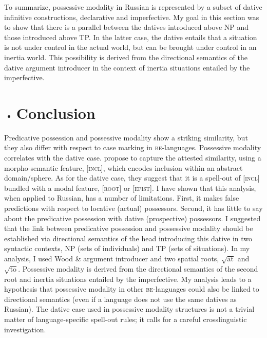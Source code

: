 \documentclass[output=paper,modfonts,nonflat]{langsci/langscibook}
\begin{document}
To summarize, possessive modality in Russian is represented by a subset of dative infinitive constructions, declarative and imperfective. My goal in this section was to show that there is a parallel between the datives introduced above NP and those introduced above TP. In the latter case, the dative entails that a situation is not under control in the actual world, but can be brought under control in an inertia world. This possibility is derived from the directional semantics of the dative argument introducer in the context of inertia situations entailed by the imperfective.

\begin{itemize}
\item \section{Conclusion}
\end{itemize}

Predicative possession and possessive modality show a striking similarity, but they also differ with respect to case marking in \textsc{be}{}-languages. Possessive modality correlates with the dative case. \citet{BjorkmanCowper2016} propose to capture the attested similarity, using a morpho-semantic feature, [\textsc{incl}], which encodes inclusion within an abstract domain/sphere. As for the dative case, they suggest that it is a spell-out of [\textsc{incl}] bundled with a modal feature, [\textsc{root}] or [\textsc{epist}]. I have shown that this analysis, when applied to Russian, has a number of limitations. First, it makes false predictions with respect to locative (actual) possessors. Second, it has little to say about the predicative possession with dative (prospective) possessors. I suggested that the link between predicative possession and possessive modality should be established via directional semantics of the head introducing this dative in two syntactic contexts, NP (sets of individuals) and TP (sets of situations). In my analysis, I used Wood \&  argument introducer and two spatial roots,  $\sqrt{\text{at}}$  and  $\sqrt{\text{to}}$. Possessive modality is derived from the directional semantics of the second root and inertia situations entailed by the imperfective. My analysis leads to a hypothesis that possessive modality in other \textsc{be}{}-languages could also be linked to directional semantics (even if a language does not use the same datives as Russian). The dative case used in possessive modality structures is not a trivial matter of language-specific spell-out rules; it calls for a careful crosslinguistic investigation.  
\end{document}
